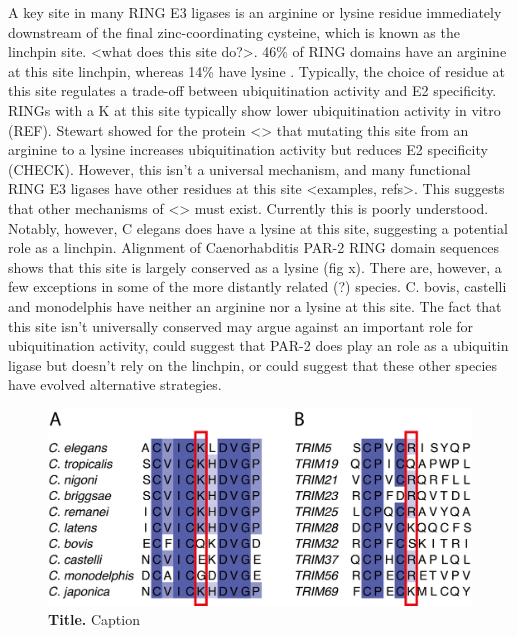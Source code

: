 \documentclass[12pt]{"article"}
\newcommand{\mycaption}[2]{\caption[#1]{\textbf{#1.} #2}}
\begin{document}
A key site in many RING E3 ligases is an arginine or lysine residue immediately downstream of the final zinc-coordinating cysteine, which is known as the linchpin site. <what does this site do?>. 46\% of RING domains have an arginine at this site linchpin, whereas 14\% have lysine \citep{Stewart2017}. Typically, the choice of residue at this site regulates a trade-off between ubiquitination activity and E2 specificity. RINGs with a K at this site typically show lower ubiquitination activity in vitro (REF). Stewart showed for the protein <> that mutating this site from an arginine to a lysine increases ubiquitination activity but reduces E2 specificity (CHECK). However, this isn’t a universal mechanism, and many functional RING E3 ligases have other residues at this site <examples, refs>. This suggests that other mechanisms of <> must exist. Currently this is poorly understood.\\

Notably, however, C elegans does have a lysine at this site, suggesting a potential role as a linchpin. Alignment of Caenorhabditis PAR-2 RING domain sequences shows that this site is largely conserved as a lysine (fig x). There are, however, a few exceptions in some of the more distantly related (?) species. C. bovis, castelli and monodelphis have neither an arginine nor a lysine at this site. The fact that this site isn’t universally conserved may argue against an important role for ubiquitination activity, could suggest that PAR-2 does play an role as a ubiquitin ligase but doesn’t rely on the linchpin, or could suggest that these other species have evolved alternative strategies.\\ 

\begin{figure}[!h]
\includegraphics[scale=0.9]{linchpin_alignments}
\setlength{\abovecaptionskip}{20pt}
\centering
\mycaption{Title}{Caption}
\label{fig:linchpin_alignments}
\end{figure}
\end{document}
